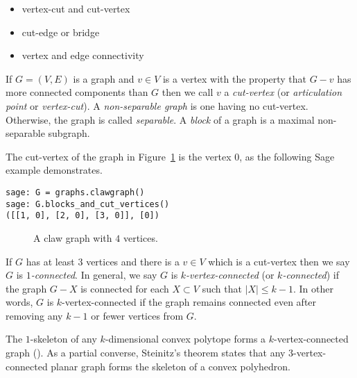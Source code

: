 \begin{itemize}
\item vertex-cut and cut-vertex

\item cut-edge or bridge

\item vertex and edge connectivity
\end{itemize}

If $G=(V,E)$ is a graph and $v\in V$ is a vertex with the property
that $G-v$ has more connected components than $G$ then
we call $v$ a {\it cut-vertex} (or {\it articulation point} or {\it vertex-cut}).
A {\it non-separable graph} is one having no cut-vertex.
Otherwise, the graph is called {\it separable}.
A {\it block} of a graph is a maximal non-separable subgraph.

\begin{example}
{\rm
The cut-vertex of the graph in Figure~\ref{fig:distance_connectivity:claw_graph}
is the vertex $0$, as the following Sage example
demonstrates.

\begin{lstlisting}
sage: G = graphs.clawgraph()
sage: G.blocks_and_cut_vertices()
([[1, 0], [2, 0], [3, 0]], [0])
\end{lstlisting}

\begin{figure}[!htbp]
\centering

\caption{A claw graph with $4$ vertices.}
\label{fig:distance_connectivity:claw_graph}
\end{figure}
}
\end{example}

If $G$ has at least $3$ vertices and there is a $v\in V$
which is a cut-vertex then we say $G$ is {\it $1$-connected}.
 In general, we say $G$ is {\it $k$-vertex-connected} (or
{\it $k$-connected})
if the graph $G-X$ is connected for each $X\subset V$
such that $|X|\leq k-1$.
In other words, $G$ is $k$-vertex-connected
if the graph remains connected even after removing
any $k-1$ or fewer vertices from $G$.

\begin{example}
The $1$-skeleton of any $k$-dimensional convex polytope forms
a $k$-vertex-connected graph
(\cite{Balinski1961}). As a partial converse, Steinitz's theorem
states that any $3$-vertex-connected planar graph forms
the skeleton of a convex polyhedron.

\end{example}


